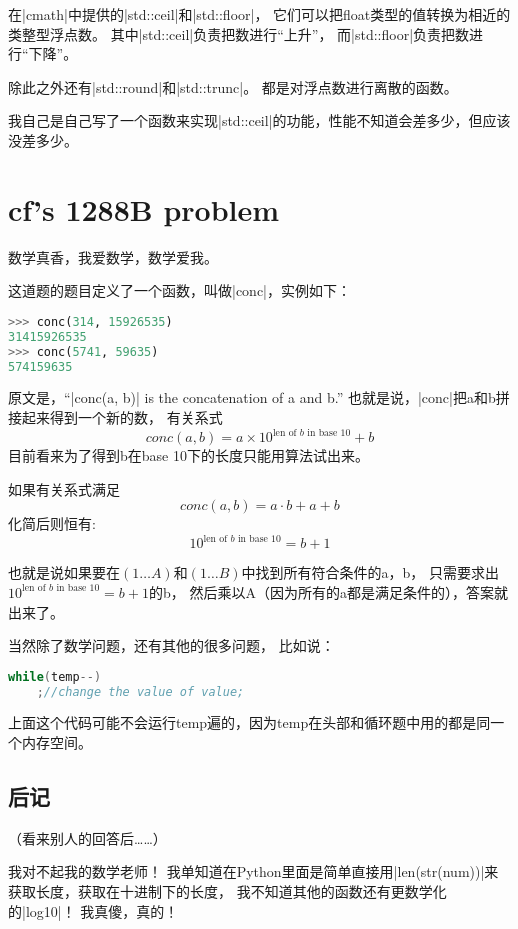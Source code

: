 在\vb|cmath|中提供的\vb|std::ceil|和\vb|std::floor|，
它们可以把float类型的值转换为相近的类整型浮点数。
其中\vb|std::ceil|负责把数进行``上升''，
而\vb|std::floor|负责把数进行``下降''。

除此之外还有\vb|std::round|和\vb|std::trunc|。
都是对浮点数进行离散的函数。

我自己是自己写了一个函数来实现\vb|std::ceil|的功能，性能不知道会差多少，但应该没差多少。


\section{cf's 1288B problem}

数学真香，我爱数学，数学爱我。

这道题的题目定义了一个函数，叫做\vb|conc|，实例如下：

\begin{lstlisting}[language=python]
>>> conc(314, 15926535)
31415926535
>>> conc(5741, 59635)
574159635
\end{lstlisting}

原文是，``\vb|conc(a, b)| is the concatenation of a and b.''
也就是说，\vb|conc|把a和b拼接起来得到一个新的数，
有关系式$$conc(a, b) = a\times 10^{\text{len of }b\text{ in base 10}} + b$$
目前看来为了得到b在base 10下的长度只能用算法试出来。

如果有关系式满足$$conc(a, b) = a\cdot b + a + b$$化简后则恒有:
$$10^{\text{len of }b\text{ in base 10}} = b + 1$$

也就是说如果要在$(1\ldots A)$和$(1\ldots B)$中找到所有符合条件的a，b，
只需要求出$10^{\text{len of }b\text{ in base 10}} = b + 1$的b，
然后乘以A（因为所有的a都是满足条件的），答案就出来了。

当然除了数学问题，还有其他的很多问题，
比如说：

\begin{lstlisting}[language=C++]
while(temp--)
    ;//change the value of value;
\end{lstlisting}

上面这个代码可能不会运行temp遍的，因为temp在头部和循环题中用的都是同一个内存空间。

\subsection{后记}
（看来别人的回答后\ldots\ldots ）

我对不起我的数学老师！
我单知道在Python里面是简单直接用\vb|len(str(num))|来获取长度，获取在十进制下的长度，
我不知道其他的函数还有更数学化的\vb|log10|！
我真傻，真的！

